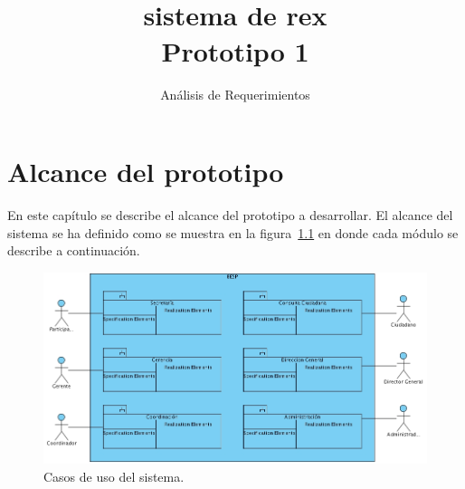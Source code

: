 \documentclass[10pt]{book}
\title{\Sistema \\\LARGE{sistema de rex \\{\bf Prototipo 1}}}
\subtitle{Análisis de Requerimientos}
\begin{document}
\maketitle\thispagestyle{empty}

\frontmatter
\tableofcontents

\mainmatter


\chapter{Alcance del prototipo}

	En este capítulo se describe el alcance del prototipo a desarrollar. El alcance del sistema se ha definido como se muestra en la figura~\ref{fig:casosDeUsoCompleto} en donde cada módulo se describe a continuación.

\begin{figure}[htbp!]
	\begin{center}
		\includegraphics[width=1\textwidth]{images/alcance.jpg}
		\caption{Casos de uso del sistema.}
		\label{fig:casosDeUsoCompleto}
	\end{center}
\end{figure}
\end{document}
